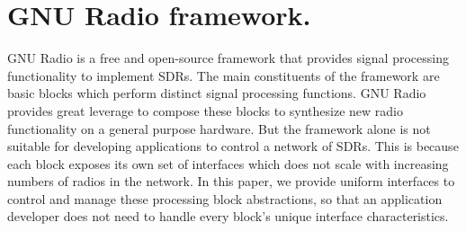 \section{GNU Radio framework.}
GNU Radio \cite{gnuradio} is a free and open-source framework that provides signal processing functionality to implement SDRs. The main constituents of the framework are basic blocks which perform distinct signal processing functions. GNU Radio provides great leverage to compose these blocks to synthesize new radio functionality on a general purpose hardware. But the framework alone is not suitable for developing applications to control a network of SDRs. This is because each block exposes its own set of interfaces which does not scale with increasing numbers of radios in the network. In this paper, we provide uniform interfaces to control and manage these processing block abstractions, so that an application developer does not need to handle every block's unique interface characteristics.

